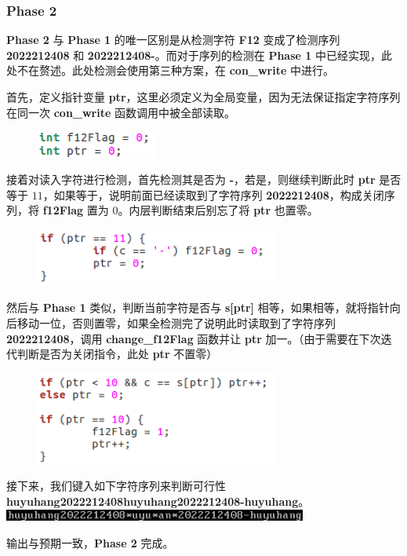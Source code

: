         \subsubsection{Phase 2}
            \par \textbf{Phase 2} 与 \textbf{Phase 1} 的唯一区别是从检测字符 \textbf{F12} 变成了检测序列 \textbf{2022212408} 和 \textbf{2022212408-}。而对于序列的检测在 \textbf{Phase 1} 中已经实现，此处不在赘述。此处检测会使用第三种方案，在 \textbf{con\_write} 中进行。
            \par 首先，定义指针变量 \textbf{ptr}，这里必须定义为全局变量，因为无法保证指定字符序列在同一次 \textbf{con\_write} 函数调用中被全部读取。
                \begin{figure}[htbp]
                    \hspace*{1.5cm}
                    \includegraphics*[width = 4cm]{s3_0.png}
                \end{figure}
            \par 接着对读入字符进行检测，首先检测其是否为 \textbf{-}，若是，则继续判断此时 \textbf{ptr} 是否等于 $11$，如果等于，说明前面已经读取到了字符序列 \textbf{2022212408}，构成关闭序列，将 \textbf{f12Flag} 置为 $0$。内层判断结束后别忘了将 \textbf{ptr} 也置零。
                \begin{figure}[htbp]
                    \hspace*{1.5cm}
                    \includegraphics*[width = 8cm]{s3_1.png}
                \end{figure}
            \par 然后与 \textbf{Phase 1} 类似，判断当前字符是否与 \textbf{s[ptr]} 相等，如果相等，就将指针向后移动一位，否则置零，如果全检测完了说明此时读取到了字符序列 \textbf{2022212408}，调用 \textbf{change\_f12Flag} 函数并让 \textbf{ptr} 加一。（由于需要在下次迭代判断是否为关闭指令，此处 \textbf{ptr} 不置零）
                \begin{figure}[htbp]
                    \hspace*{1.5cm}
                    \includegraphics*[width = 8cm]{s3_2.png}
                \end{figure}
            \par 接下来，我们键入如下字符序列来判断可行性 \textbf{huyuhang2022212408huyuhang2022212408-huyuhang}。
                \hspace*{0.5cm}
                \includegraphics*[width = 10cm]{s3_10.png}
                
            \par 输出与预期一致，\textbf{Phase 2} 完成。
